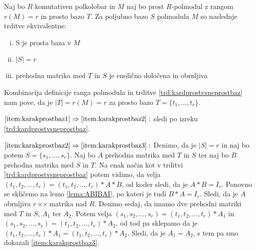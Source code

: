 \documentclass[mat1]{fmfdelo}
\newcommand{\abs}[1]{\ensuremath{\lvert #1 \rvert}}
\begin{document}
\begin{izrek}\label{izr:karakprostbaz}
Naj bo $R$ komutativen polkolobar in $M$ naj bo prost $R$-polmodul z rangom $r(M) = r$ in prosto bazo $T$. Za poljubno bazo $S$ polmodula $M$ so naslednje trditve ekvivalentne: \begin{enumerate}[i.]
	\item\label{item:karakprostbaz1} S je prosta baza v $M$
	\item\label{item:karakprostbaz2} $\abs{S} = r$
	\item\label{item:karakprostbaz3} prehodna matrika med $T$ in $S$ je enolično določena in obrnljiva
\end{enumerate}
\end{izrek}
\begin{dokaz}
Kombinacija definicije ranga polmodula in trditve \ref{trd:kardprostvsneprostbaz} nam pove, da je $\abs{T} = r(M) = r$ za prosto bazo $T = \{t_1, \ldots, t_r\}$.

$\ref{item:karakprostbaz1}\Rightarrow \ref{item:karakprostbaz2}:$ sledi po izreku \ref{trd:kardprostvsneprostbaz}.

$\ref{item:karakprostbaz2}\Rightarrow \ref{item:karakprostbaz3}:$ Denimo, da je $\abs{S} = r$ in naj bo potem $S = \{s_1, \ldots, s_r\}$. Naj bo $A$ prehodna matrika med $T$ in $S$ ter naj bo $B$ prehodna matrika med $S$ in $T$. Na enak način kot v trditvi \ref{trd:kardprostvsneprostbaz} potem vidimo, da velja $(t_1, t_2, \ldots, t_r) = (t_1, t_2, \ldots, t_r)*A*B$, od koder sledi, da je $A*B = I_r$. Ponovno se skličemo na lemo \ref{lema:ABIBAI}, po kateri je tudi $B*A = I_r$. Sledi, da je $A$ obrnljiva $r\times r$ matrika nad $R$. Denimo sedaj, da imamo dve prehodni matriki med $T$ in $S$, $A_1$ ter $A_2$. Potem velja $(s_1, s_2, \ldots, s_r) = (t_1, t_2, \ldots, t_r)*A_1$ in $(s_1, s_2, \ldots, s_r) = (t_1, t_2, \ldots, t_r)*A_2$, od tod pa sklepamo da je $(t_1, t_2, \ldots, t_r)*A_1 = (t_1, t_2, \ldots, t_r)*A_2$. Sledi, da je $A_1 = A_2$, s tem pa smo dokazali \ref{item:karakprostbaz3}.


\end{dokaz}
\end{document}
